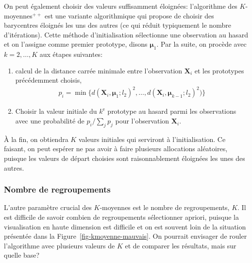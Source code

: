 \documentclass[
  11pt,
  letterpaper,
]{book}
\providecommand{\tightlist}{%
  \setlength{\itemsep}{0pt}\setlength{\parskip}{0pt}}\usepackage{longtable,booktabs,array}
\theoremstyle{definition}
\theoremstyle{remark}
\begin{document}
On peut également choisir des valeurs suffisamment éloignées:
l'algorithme des \(K\)-moyennes\({}^{++}\) est une variante
algorithmique qui propose de choisir des barycentres éloignés les uns
des autres (ce qui réduit typiquement le nombre d'itérations). Cette
méthode d'initialisation sélectionne une observation au hasard et on
l'assigne comme premier prototype, disons \(\boldsymbol{\mu}_1\). Par la
suite, on procède avec \(k=2, \ldots, K\) aux étapes suivantes:

\begin{enumerate}
\def\labelenumi{\arabic{enumi}.}
\tightlist
\item
  calcul de la distance carrée minimale entre l'observation
  \(\mathbf{X}_i\) et les prototypes précédemment choisis,
  \begin{align*}
  p_i = \min \{d(\mathbf{X}_i, \boldsymbol{\mu}_1; l_2)^2, \ldots, d(\mathbf{X}_i, \boldsymbol{\mu}_{k-1}; l_2)^2)\}
  \end{align*}
\item
  Choisir la valeur initiale du \(k^{\text{e}}\) prototype au hasard
  parmi les observations avec une probabilité de \(p_i/\sum_{j} p_j\)
  pour l'observation \(\mathbf{X}_i\).
\end{enumerate}

À la fin, on obtiendra \(K\) valeurs initiales qui serviront à
l'initialisation. Ce faisant, on peut espérer ne pas avoir à faire
plusieurs allocations aléatoires, puisque les valeurs de départ choisies
sont raisonnablement éloignées les unes des autres.

\hypertarget{nombre-de-regroupements}{%
\subsubsection*{Nombre de regroupements}\label{nombre-de-regroupements}}

L'autre paramètre crucial des \(K\)-moyennes est le nombre de
regroupements, \(K\). Il est difficile de savoir combien de
regroupements sélectionner apriori, puisque la visualisation en haute
dimension est difficile et on est souvent loin de la situation présentée
dans la Figure~\ref{fig-kmoyenne-mauvais}. On pourrait envisager de
rouler l'algorithme avec plusieurs valeurs de \(K\) et de comparer les
résultats, mais sur quelle base?
\end{document}
